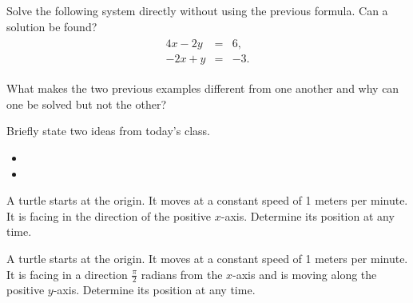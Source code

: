 \begin{problem}
\vfill
\clearpage

\item Solve the following system directly without using the previous formula. Can a solution be found?
\begin{eqnarray*}
  \begin{array}{lcl}
     4x - 2y & = & 6, \\
    -2x + y & = & -3.
  \end{array}
\end{eqnarray*}

\vfill

\item What makes the two previous examples different from one another and why can one be solved but not the other?
  \vspace{4em}


\end{problem}


\postClass

\begin{problem}
\item Briefly state two ideas from today's class.
  \begin{itemize}
  \item
  \item
  \end{itemize}
\item
  \begin{subproblem}
    \item
  \end{subproblem}
\end{problem}



\begin{problem}
\item A turtle starts at the origin. It moves at a constant speed of 1
  meters per minute. It is facing in the direction of the positive $x$-axis.
  Determine its position at any time.

  \vfill

\item A turtle starts at the origin. It moves at a constant speed of 1
  meters per minute. It is facing in a direction $\frac{\pi}{2}$
  radians from the $x$-axis and is moving along the positive $y$-axis.
  Determine its position at any time.

  \vfill


\end{problem}


